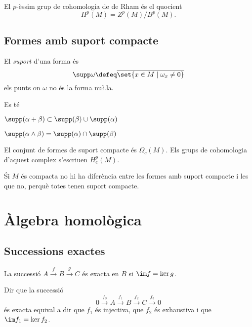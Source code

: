 \documentclass[12pt,twocolumn]{article}
\begin{document}
\begin{definition}
	El \( p \)-èssim grup de cohomologia de de Rham és el quocient
	\begin{equation*}
		H^p(M) = Z^p(M)/B^p(M).
	\end{equation*}
\end{definition}

\subsection{Formes amb suport compacte}
\begin{definition}[Suport]
	El \emph{suport} d'una forma és 
	\begin{equation*}
		\supp \omega \defeq \overline{\set{x \in M \mid \omega_x \neq 0}}
	\end{equation*}
	els punts on \( \omega \) no és la forma nu\l.la.
\end{definition}
\begin{observation}
	Es té
	\begin{points}
	\item \( \supp(\alpha + \beta) \subset \supp(\beta) \cup \supp(\alpha) \)
	\item \( \supp(\alpha \wedge \beta) = \supp(\alpha) \cap \supp(\beta) \)
	\end{points}
\end{observation}
\begin{definition}
	El conjunt de formes de suport compacte és \( \Omega_c(M) \). Els grups de cohomologia
	d'aquest complex s'escriuen \( H_c^p(M) \).
\end{definition}
\begin{observation}
	Śi \( M \) és compacta no hi ha diferència entre les formes amb suport compacte i les
	que no, perquè totes tenen suport compacte. 
\end{observation}

\section{Àlgebra homològica}
\subsection{Successions exactes}
\begin{definition}
	La successió \( A \xrightarrow{f} B \xrightarrow{g} C \) és exacta en \( B \) si \( \im
	f = \ker g \).
\end{definition}
\begin{observation}
	Dir que la successió
	\begin{equation*}
		0 \xrightarrow{f_0} A \xrightarrow{f_1} B \xrightarrow{f_2} C \xrightarrow{f_3} 0
	\end{equation*}
és exacta equival a dir que \( f_1 \) és injectiva, que \( f_2 \) és exhaustiva i que \(
\im f_1 = \ker f_2 \). 
\end{observation}
\end{document}

